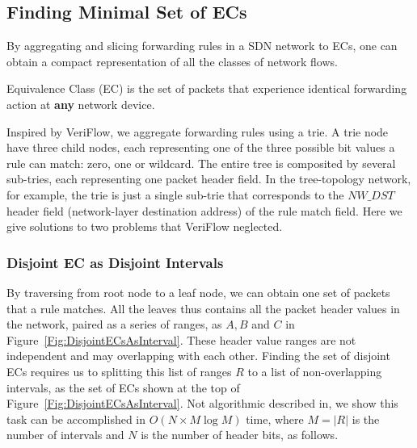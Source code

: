 \subsection{Finding Minimal Set of ECs}
By aggregating and slicing forwarding rules in a SDN network to ECs,
one can obtain a compact representation of all the classes of network flows.
\begin{definition}
Equivalence Class (EC) is the set of packets that
experience identical forwarding action at \textbf{any} network device.
\label{Def:EC}
\end{definition}
Inspired by VeriFlow\cite{Veriflow}, we aggregate forwarding rules using a trie.
A trie node have three child nodes, each representing one of the three possible
bit values a rule can match: zero, one or wildcard.
The entire tree is composited by several sub-tries,
each representing one packet header field.
In the tree-topology network, for example, the trie is just a single sub-trie that
corresponds to the $NW\_DST$ header field (network-layer destination address)
of the rule match field.
Here we give solutions to two problems that VeriFlow neglected.

\subsubsection{Disjoint EC as Disjoint Intervals}
By traversing from root node to a leaf node, we can obtain one set of packets
that a rule matches.
All the leaves thus contains all the packet header values in the network,
paired as a series of ranges, as $A, B$ and $C$ in Figure~\ref{Fig:DisjointECsAsInterval}.
These header value ranges are not independent and may overlapping with each other.
Finding the set of disjoint ECs requires us to splitting this list of ranges $R$ to
a list of non-overlapping intervals,
as the set of ECs shown at the top of Figure~\ref{Fig:DisjointECsAsInterval}.
Not algorithmic described in\cite{Veriflow},
we show this task can be accomplished in $O(N \times M\log M)$ time,
where $M=|R|$ is the number of intervals and $N$ is the number of header bits,
as follows\cite{SplitDisjointInterval}.

